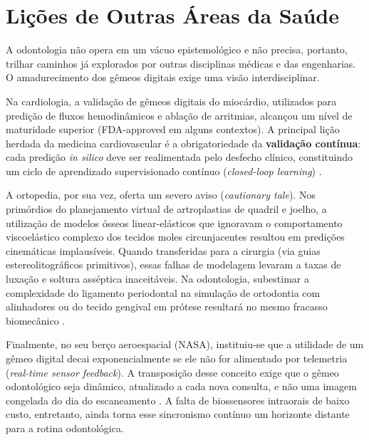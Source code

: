 \section{Lições de Outras Áreas da Saúde}

A odontologia não opera em um vácuo epistemológico e não precisa, portanto, trilhar caminhos já explorados por outras disciplinas médicas e das engenharias. O amadurecimento dos gêmeos digitais exige uma visão interdisciplinar.

Na cardiologia, a validação de gêmeos digitais do miocárdio, utilizados para predição de fluxos hemodinâmicos e ablação de arritmias, alcançou um nível de maturidade superior (FDA-approved em alguns contextos). A principal lição herdada da medicina cardiovascular é a obrigatoriedade da \textbf{validação contínua}: cada predição \textit{in silico} deve ser realimentada pelo desfecho clínico, constituindo um ciclo de aprendizado supervisionado contínuo (\textit{closed-loop learning}) \cite{katsoulakis2024digital}. 

A ortopedia, por sua vez, oferta um severo aviso (\textit{cautionary tale}). Nos primórdios do planejamento virtual de artroplastias de quadril e joelho, a utilização de modelos ósseos linear-elásticos que ignoravam o comportamento viscoelástico complexo dos tecidos moles circunjacentes resultou em predições cinemáticas implausíveis. Quando transferidas para a cirurgia (via guias estereolitográficos primitivos), essas falhas de modelagem levaram a taxas de luxação e soltura asséptica inaceitáveis. Na odontologia, subestimar a complexidade do ligamento periodontal na simulação de ortodontia com alinhadores ou do tecido gengival em prótese resultará no mesmo fracasso biomecânico \cite{li2025impacts}.

Finalmente, no seu berço aeroespacial (NASA), instituiu-se que a utilidade de um gêmeo digital decai exponencialmente se ele não for alimentado por telemetria (\textit{real-time sensor feedback}). A transposição desse conceito exige que o gêmeo odontológico seja dinâmico, atualizado a cada nova consulta, e não uma imagem congelada do dia do escaneamento \cite{menon2026digital}. A falta de biossensores intraorais de baixo custo, entretanto, ainda torna esse sincronismo contínuo um horizonte distante para a rotina odontológica.
